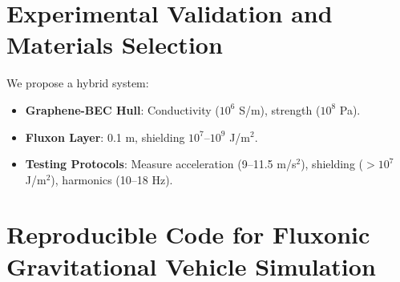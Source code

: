 \documentclass[11pt]{article}
\begin{document}
\section{Experimental Validation and Materials Selection}
We propose a hybrid system:
\begin{itemize}
    \item \textbf{Graphene-BEC Hull}: Conductivity ($10^6$ S/m), strength ($10^8$ Pa).
    \item \textbf{Fluxon Layer}: 0.1 m, shielding $10^7$--$10^9$ J/m$^2$.
    \item \textbf{Testing Protocols}: Measure acceleration (9--11.5 m/s$^2$), shielding ($>10^7$ J/m$^2$), harmonics (10--18 Hz).
\end{itemize}

\section{Reproducible Code for Fluxonic Gravitational Vehicle Simulation}
\end{document}
